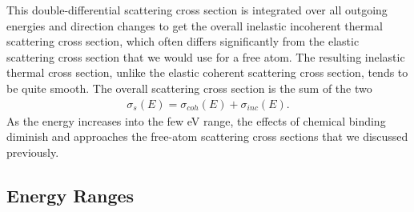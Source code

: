 This double-differential scattering cross section is integrated over all outgoing energies and direction changes to get the overall inelastic incoherent thermal scattering cross section, which often differs significantly from the elastic scattering cross section that we would use for a free atom. The resulting inelastic thermal cross section, unlike the elastic coherent scattering cross section, tends to be quite smooth. The overall scattering cross section is the sum of the two
\begin{align}
  \sigma_s(E) = \sigma_{coh}(E) + \sigma_{inc}(E).
\end{align}
As the energy increases into the few eV range, the effects of chemical binding diminish and approaches the free-atom scattering cross sections that we discussed previously.

\subsection{Energy Ranges}

